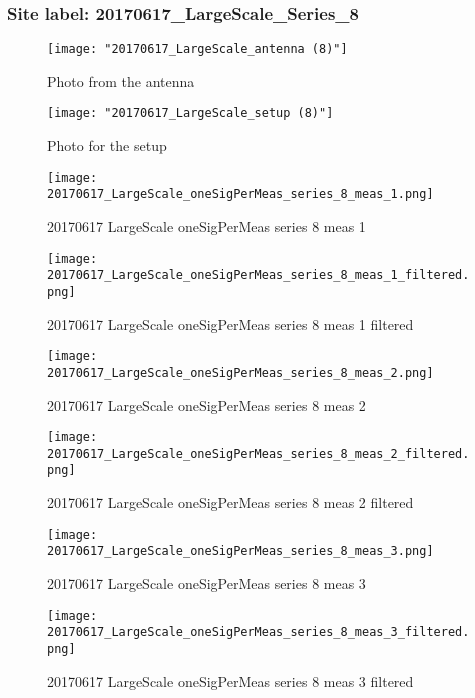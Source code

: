 \subsubsection{Site label: 20170617\_LargeScale\_Series\_8}
\begin{figure}[ht] \caption{Photo from the antenna}
\texttt{[image: "20170617\_LargeScale\_antenna (8)"]}\centering\end{figure}
\begin{figure}[ht] \caption{Photo for the setup}
\texttt{[image: "20170617\_LargeScale\_setup (8)"]}\centering\end{figure}
\begin{figure}[ht] \caption{20170617 LargeScale oneSigPerMeas series 8 meas 1}
\texttt{[image: 20170617\_LargeScale\_oneSigPerMeas\_series\_8\_meas\_1.png]}\centering\end{figure}
\begin{figure}[ht] \caption{20170617 LargeScale oneSigPerMeas series 8 meas 1 filtered}
\texttt{[image: 20170617\_LargeScale\_oneSigPerMeas\_series\_8\_meas\_1\_filtered.png]}\centering\end{figure}
\begin{figure}[ht] \caption{20170617 LargeScale oneSigPerMeas series 8 meas 2}
\texttt{[image: 20170617\_LargeScale\_oneSigPerMeas\_series\_8\_meas\_2.png]}\centering\end{figure}
\begin{figure}[ht] \caption{20170617 LargeScale oneSigPerMeas series 8 meas 2 filtered}
\texttt{[image: 20170617\_LargeScale\_oneSigPerMeas\_series\_8\_meas\_2\_filtered.png]}\centering\end{figure}
\begin{figure}[ht] \caption{20170617 LargeScale oneSigPerMeas series 8 meas 3}
\texttt{[image: 20170617\_LargeScale\_oneSigPerMeas\_series\_8\_meas\_3.png]}\centering\end{figure}
\begin{figure}[ht] \caption{20170617 LargeScale oneSigPerMeas series 8 meas 3 filtered}
\texttt{[image: 20170617\_LargeScale\_oneSigPerMeas\_series\_8\_meas\_3\_filtered.png]}\centering\end{figure}
\clearpage
